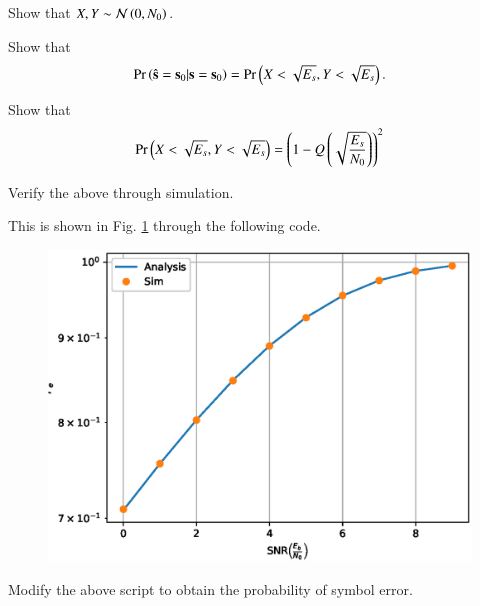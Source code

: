 \documentclass[journal,12pt,twocolumn]{IEEEtran}
\begin{document}
\begin{problem}
Show that $X,Y \sim \mathcal{N}\left(0,N_0\right)$.
\end{problem}
\begin{problem}
Show that 
\begin{equation}
\Pr\left(\hat{\mathbf{s}} = \mathbf{s}_0|\mathbf{s} = \mathbf{s}_0\right) =\Pr\left( X < \sqrt{E_s},  Y < \sqrt{E_s}\right).
\end{equation}
\end{problem}
\begin{problem}
Show that 
\begin{equation}
\Pr\left( X < \sqrt{E_s},  Y < \sqrt{E_s}\right) = \left(1-Q\left(\sqrt{\frac{E_s}{N_0}}\right)\right)^2
\end{equation}
\end{problem}
\begin{problem}
Verify the above through simulation.
\end{problem}
\solution 
This is shown in Fig. \ref{fig:qpsk} through the following code.

%
\begin{figure}[!h]
\centering
\includegraphics[width=\columnwidth]{./figs/qpsk.eps}
\caption{}
\label{fig:qpsk}
\end{figure}
\begin{problem}
Modify the above script to obtain the probability of symbol error.
\end{problem}
\end{document}
